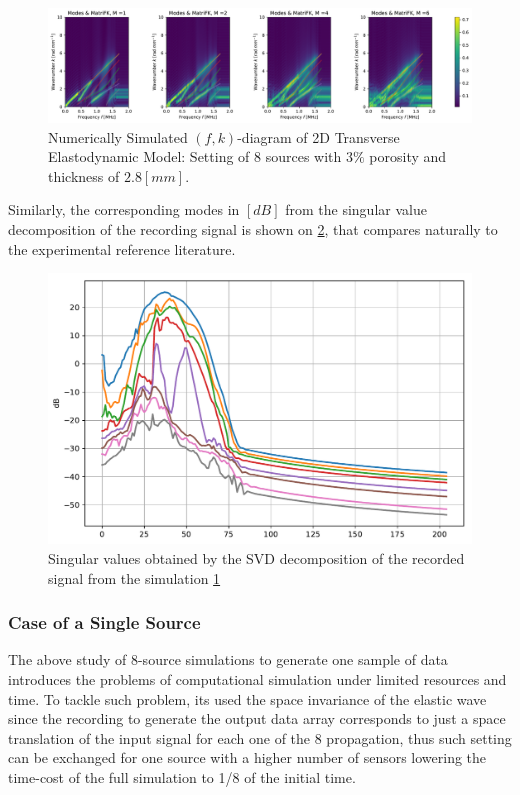 \begin{figure}[!h]
	\centering
	\includegraphics[width=\textwidth]{images/TimeMultSous/2DTimeS8P3ElasticFK28M780_y.pdf}
	\caption{Numerically Simulated $(f,k)$-diagram of 2D Transverse Elastodynamic Model: Setting of 8 sources with $3\%$ porosity and thickness of $2.8 [mm]$.}
	\label{FK-DiagramS8P3M28}
\end{figure}

Similarly, the corresponding modes in $[dB]$ from the singular value decomposition of the recording signal is shown on \ref{SVD-S8P3M28}, that compares naturally to the experimental reference literature.

\begin{figure}[!h]
	\centering
	\includegraphics[scale=.5]{images/TimeMultSous/2DTimeS8P3Elastic28_SV.pdf}
	\caption{Singular values obtained by the SVD decomposition of the recorded signal from the simulation \ref{FK-DiagramS8P3M28}}
	\label{SVD-S8P3M28}
\end{figure}



\subsubsection{Case of a Single Source}
The above study of 8-source simulations to generate one sample of data introduces the problems of computational simulation under limited resources and time. 
To tackle such problem, its used the space invariance of the elastic wave since the recording to generate the output data array corresponds to just a space translation of the input signal for each one of the 8 propagation, thus such setting can be exchanged for one source with a higher number of sensors lowering the time-cost of the full simulation to 1/8 of the initial time.

